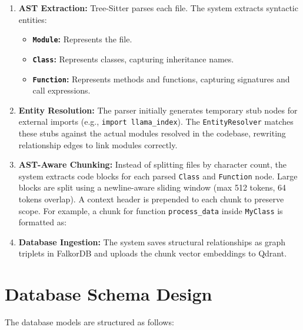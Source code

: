 \documentclass[12pt,a4paper,oneside]{report}
\begin{document}
\begin{enumerate}
    \item \textbf{AST Extraction:} Tree-Sitter parses each file. The system extracts syntactic entities:
    \begin{itemize}
        \item \textbf{\texttt{Module}:} Represents the file.
        \item \textbf{\texttt{Class}:} Represents classes, capturing inheritance names.
        \item \textbf{\texttt{Function}:} Represents methods and functions, capturing signatures and call expressions.
    \end{itemize}
    \item \textbf{Entity Resolution:} The parser initially generates temporary stub nodes for external imports (e.g., \texttt{import llama\_index}). The \texttt{EntityResolver} matches these stubs against the actual modules resolved in the codebase, rewriting relationship edges to link modules correctly.
    \item \textbf{AST-Aware Chunking:} Instead of splitting files by character count, the system extracts code blocks for each parsed \texttt{Class} and \texttt{Function} node. Large blocks are split using a newline-aware sliding window (max 512 tokens, 64 tokens overlap). A context header is prepended to each chunk to preserve scope. For example, a chunk for function \texttt{process\_data} inside \texttt{MyClass} is formatted as:
    \begin{center}
    \end{center}
    \item \textbf{Database Ingestion:} The system saves structural relationships as graph triplets in FalkorDB and uploads the chunk vector embeddings to Qdrant.
\end{enumerate}

\section{Database Schema Design}
The database models are structured as follows:
\end{document}

